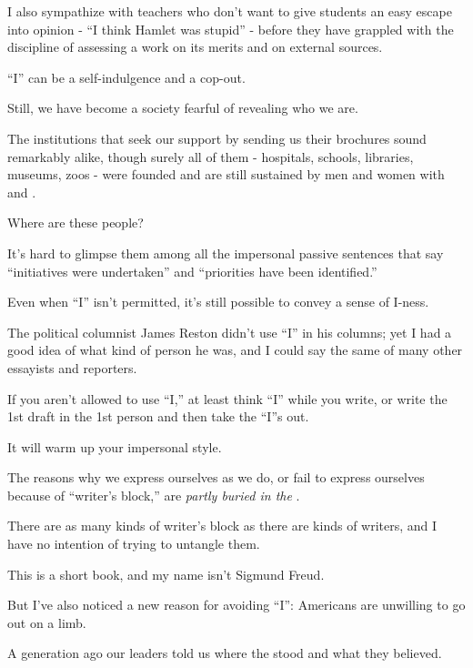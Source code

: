 \documentclass{book}
\numberwithin{equation}{section}
\begin{document}
I also sympathize with teachers who don't want to give students an easy escape into opinion - ``I think Hamlet was stupid'' - before they have grappled with the discipline of assessing a work on its merits and on external sources.

``I'' can be a self-indulgence and a cop-out.

%
Still, we have become a society fearful of revealing who we are.

The institutions that seek our support by sending us their brochures sound remarkably alike, though surely all of them - hospitals, schools, libraries, museums, zoos - were founded and are still sustained by men and women with  and .

Where are these people?

It's hard to glimpse them among all the impersonal passive sentences that say ``initiatives were undertaken'' and ``priorities have been identified.''

%
Even when ``I'' isn't permitted, it's still possible to convey a sense of I-ness.

The political columnist James Reston didn't use ``I'' in his columns; yet I had a good idea of what kind of person he was, and I could say the same of many other essayists and reporters.


If you aren't allowed to use ``I,'' at least think ``I'' while you write, or write the 1st draft in the 1st person and then take the ``I''s out.

It will warm up your impersonal style.


The reasons why we express ourselves as we do, or fail to express ourselves because of ``writer's block,'' are \textit{partly buried in the }.

There are as many kinds of writer's block as there are kinds of writers, and I have no intention of trying to untangle them.

This is a short book, and my name isn't Sigmund Freud.

%
But I've also noticed a new reason for avoiding ``I'': Americans are unwilling to go out on a limb.

A generation ago our leaders told us where the stood and what they believed.
\end{document}
